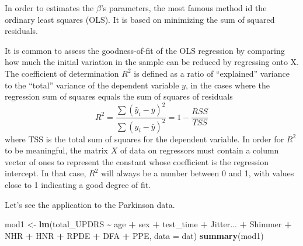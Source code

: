 \documentclass[
]{article}
\newenvironment{Shaded}{\begin{snugshade}}{\end{snugshade}}
\newcommand{\AttributeTok}[1]{\textcolor[rgb]{0.13,0.29,0.53}{#1}}
\newcommand{\FunctionTok}[1]{\textcolor[rgb]{0.13,0.29,0.53}{\textbf{#1}}}
\newcommand{\NormalTok}[1]{#1}
\newcommand{\OtherTok}[1]{\textcolor[rgb]{0.56,0.35,0.01}{#1}}
\newcommand{\SpecialCharTok}[1]{\textcolor[rgb]{0.81,0.36,0.00}{\textbf{#1}}}
\begin{document}
In order to estimates the \(\beta\)'s parameters, the most famous method
id the ordinary least squares (OLS). It is based on minimizing the sum
of squared residuals.

It is common to assess the goodness-of-fit of the OLS regression by
comparing how much the initial variation in the sample can be reduced by
regressing onto X. The coefficient of determination \(R^2\) is defined
as a ratio of ``explained'' variance to the ``total'' variance of the
dependent variable \(y\), in the cases where the regression sum of
squares equals the sum of squares of residuals
\[R^2 = \frac{\sum(\hat{y}_i - \bar{y})^2}{\sum(y_i - \bar{y})^2} = 1 - \frac{RSS}{TSS}\]
where TSS is the total sum of squares for the dependent variable. In
order for \(R^2\) to be meaningful, the matrix \(X\) of data on
regressors must contain a column vector of ones to represent the
constant whose coefficient is the regression intercept. In that case,
\(R^2\) will always be a number between 0 and 1, with values close to 1
indicating a good degree of fit.

Let's see the application to the Parkinson data.

\begin{Shaded}
\begin{Highlighting}[]
\NormalTok{mod1 }\OtherTok{\textless{}{-}} \FunctionTok{lm}\NormalTok{(total\_UPDRS }\SpecialCharTok{\textasciitilde{}}\NormalTok{ age }\SpecialCharTok{+}\NormalTok{ sex }\SpecialCharTok{+}\NormalTok{ test\_time }\SpecialCharTok{+}\NormalTok{ Jitter... }\SpecialCharTok{+}
\NormalTok{             Shimmer }\SpecialCharTok{+}\NormalTok{ NHR }\SpecialCharTok{+}\NormalTok{ HNR }\SpecialCharTok{+}\NormalTok{ RPDE }\SpecialCharTok{+}\NormalTok{ DFA }\SpecialCharTok{+}\NormalTok{ PPE,}
           \AttributeTok{data =}\NormalTok{ dat)}
\FunctionTok{summary}\NormalTok{(mod1)}
\end{Highlighting}
\end{Shaded}
\end{document}

